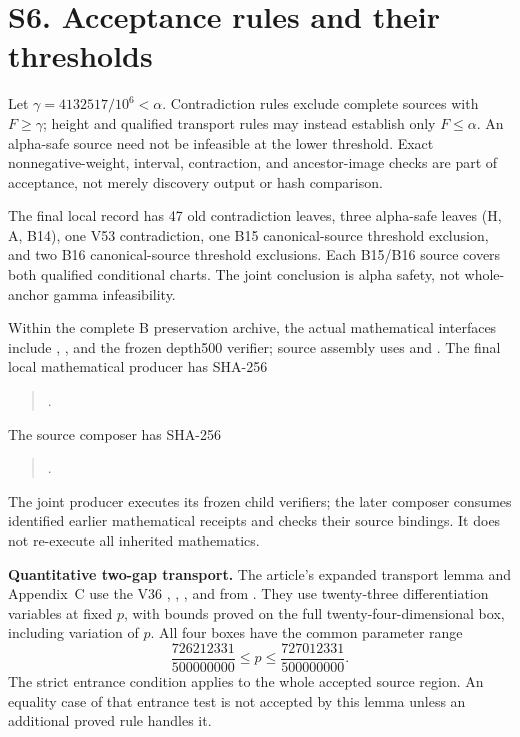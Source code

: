\documentclass[10pt]{article}
\begin{document}
\section*{S6. Acceptance rules and their thresholds}

Let \(\gamma=4132517/10^6<\alpha\). Contradiction rules exclude complete
sources with \(F\ge\gamma\); height and qualified transport rules may
instead establish only \(F\le\alpha\). An alpha-safe source need not
be infeasible at the lower threshold. Exact nonnegative-weight,
interval, contraction, and ancestor-image checks are part of acceptance,
not merely discovery output or hash comparison.

The final local record has 47 old contradiction leaves, three alpha-safe
leaves (H, A, B14), one V53 contradiction, one B15 canonical-source
threshold exclusion, and two B16 canonical-source threshold exclusions.
Each B15/B16 source covers both qualified conditional charts. The joint
conclusion is alpha safety, not whole-anchor gamma infeasibility.

Within the complete B preservation archive, the actual mathematical
interfaces include ,
, and the frozen depth500 verifier; source assembly
uses  and
. The final local mathematical producer
 has SHA-256
\begin{quote}
.
\end{quote}
The source composer  has SHA-256
\begin{quote}
.
\end{quote}
The joint producer executes its frozen child verifiers; the later
composer consumes identified earlier mathematical receipts and checks
their source bindings. It does not re-execute all inherited mathematics.

\textbf{Quantitative two-gap transport.}
The article's expanded transport lemma and Appendix~C use the V36
,
, , and
 from .
They use twenty-three differentiation variables at fixed \(p\), with
bounds proved on the full twenty-four-dimensional box, including
variation of \(p\). All four boxes have the common parameter range
\[
\frac{726212331}{500000000}\le p\le
\frac{727012331}{500000000}.
\]
The strict entrance condition applies to the whole accepted source
region. An equality case of that entrance test is not accepted by this
lemma unless an additional proved rule handles it.
\end{document}
